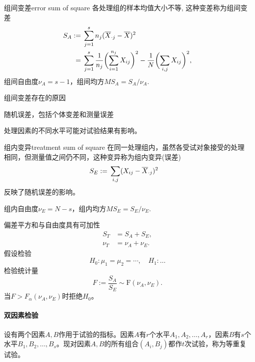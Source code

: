 \begin{definition}{组间变差}{error sum of square}
	各处理组的样本均值大小不等, 这种变差称为组间变差%
	\begin{subequations}
		\begin{align}
			S_A:={}&\sum_{j=1}^sn_j(\overline{X}_{\cdot j}-\overline{X})^2\\\notag
			={}&\sum_{j=1}^s\frac1{n_j}\biggl(\sum_{i=1}^{n_j}X_{ij}\biggr)^2-\frac1N\biggl(\sum_{i,j}X_{ij}\biggr)^2,
		\end{align}
	\end{subequations}
	组间自由度$\nu_A=s-1$，组间均方$MS_A=S_A/\nu_A.$
\end{definition}
组间变差存在的原因
\begin{compactitem}
	\item 随机误差，包括个体变差和测量误差
	\item 处理因素的不同水平可能对试验结果有影响。
\end{compactitem}
\begin{definition}{组内变异}{treatment sum of square}
	在同一处理组内，虽然各受试对象接受的处理相同，但测量值之间仍不同，这种变异称为组内变异(误差)
	\begin{align}
		S_E:={}&\sum_{i,j}(X_{ij}-\avg X_{\cdot j})^2%
	\end{align}
	反映了随机误差的影响。

	组内自由度$\nu_E=N-s$，组内均方$MS_E=S_E/\nu_E.$
\end{definition}
偏差平方和与自由度具有可加性
\begin{subequations}
	\begin{align*}
		S_T&=S_A+S_E,\\
		\nu_T&=\nu_A+\nu_E.
	\end{align*}
\end{subequations}
假设检验
\[
	H_0:\mu_1=\mu_2=\cdots,\quad H_1:\ldots
\]
检验统计量 
\begin{equation}
	F:=\frac{S_A}{S_E}\sim\mathrm F(\nu_A,\nu_E).
\end{equation}
当$F>F_\alpha(\nu_A,\nu_E)$时拒绝$H_0$。
\paragraph{双因素检验}
设有两个因素$A,B$作用于试验的指标。因素$ A $有$ r $个水平$ A_1, A_2,\ldots, A_r$，因素$ B $有$ s $个水平$ B_1, B_2,\ldots, B_s $。现对因素$ A, B $的所有组合$(A_i, B_j)$都作$t$次试验，称为等重复试验。

